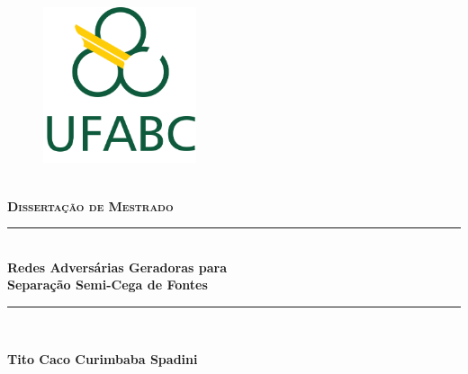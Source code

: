 \begin{titlepage}
		\newcommand{\HRule}{\rule{\linewidth}{0.5mm}}

		\center

		\begin{figure}
			\centering
			\includegraphics[width=0.4\textwidth]{figs/logo_ufabc.png}
		\end{figure}

		\\[0.5cm]
		\textsc{\textbf{\Large Dissertação de Mestrado}}\\[0.5cm] %


		\vspace{1.0cm}

		\HRule \\[0.4cm]
		{ \huge \bfseries Redes Adversárias Geradoras para \\[0.5cm] Separação Semi-Cega de Fontes}\\[0.25cm] %
		\HRule \\[1.0cm]

		\vspace{0.5cm}


		\vspace{1.0cm}

		\textbf{\LARGE Tito Caco Curimbaba Spadini}\\[1.0cm]


\end{titlepage}
